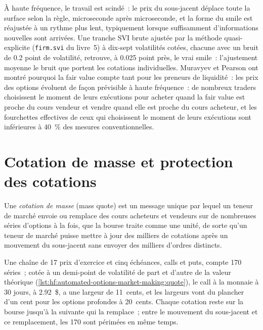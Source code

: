 À haute fréquence, le travail est scindé~: le prix du sous-jacent déplace toute la surface selon la règle, microseconde après microseconde, et la
forme du smile est réajustée à un rythme plus lent, typiquement lorsque suffisamment d'informations nouvelles sont arrivées. Une tranche SVI brute ajustée par la méthode quasi-explicite
(\texttt{firm.svi} du livre~5) à dix-sept volatilités cotées, chacune avec un bruit de 0.2 point de volatilité, retrouve, à 0.025 point près, le vrai smile~:
l'ajustement moyenne le bruit que portent les cotations individuelles. Muravyev et Pearson ont montré pourquoi la fair value compte tant pour les preneurs de liquidité~: les prix des options
évoluent de façon prévisible à haute fréquence~: de nombreux traders choisissent le moment de leurs exécutions pour acheter quand la fair value est proche du cours vendeur et vendre quand elle est proche du
cours acheteur, et les fourchettes effectives de ceux qui choisissent le moment de leurs exécutions sont inférieures à 40~\% des mesures conventionnelles.

\section{Cotation de masse et protection des cotations}

\begin{definition}\label{def:hf:automated-options-market-making:mass}
Une \emph{cotation de masse} (mass quote) est un message unique par lequel un teneur de marché envoie ou remplace des cours acheteurs et vendeurs sur de nombreuses séries d'options à
la fois, que la bourse traite comme une unité, de sorte qu'un teneur de marché puisse mettre à jour des milliers de cotations après un mouvement du sous-jacent sans envoyer
des milliers d'ordres distincts.
\end{definition}

Une chaîne de 17 prix d'exercice et cinq échéances, calls et puts, compte 170 séries~; cotée à un demi-point de volatilité de part et d'autre de la valeur
théorique (\cref{lst:hf:automated-options-market-making:quote}), le call à la monnaie à 30 jours, à 2.92~\$, a une largeur de 11~cents, et les largeurs vont du
plancher d'un cent pour les options profondes à 20~cents. Chaque cotation reste sur la bourse jusqu'à la  suivante qui la remplace~; entre le mouvement du sous-jacent et ce
remplacement, les 170 sont périmées en même temps.


